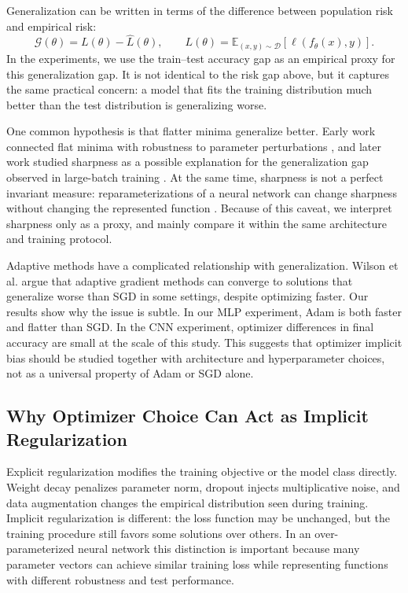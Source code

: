 \documentclass[11pt]{article}
\begin{document}
Generalization can be written in terms of the difference between population risk and empirical risk:
\[
\mathcal{G}(\theta)
= L(\theta)-\widehat L(\theta),
\qquad
L(\theta)=\mathbb{E}_{(x,y)\sim \mathcal{D}}
[\ell(f_\theta(x),y)].
\]
In the experiments, we use the train--test accuracy gap as an empirical proxy for this generalization gap. It is not identical to the risk gap above, but it captures the same practical concern: a model that fits the training distribution much better than the test distribution is generalizing worse.

One common hypothesis is that flatter minima generalize better. Early work connected flat minima with robustness to parameter perturbations \cite{hochreiter1997flat}, and later work studied sharpness as a possible explanation for the generalization gap observed in large-batch training \cite{keskar2017large}. At the same time, sharpness is not a perfect invariant measure: reparameterizations of a neural network can change sharpness without changing the represented function \cite{dinh2017sharp}. Because of this caveat, we interpret sharpness only as a proxy, and mainly compare it within the same architecture and training protocol.

Adaptive methods have a complicated relationship with generalization. Wilson et al. \cite{wilson2017marginal} argue that adaptive gradient methods can converge to solutions that generalize worse than SGD in some settings, despite optimizing faster. Our results show why the issue is subtle. In our MLP experiment, Adam is both faster and flatter than SGD. In the CNN experiment, optimizer differences in final accuracy are small at the scale of this study. This suggests that optimizer implicit bias should be studied together with architecture and hyperparameter choices, not as a universal property of Adam or SGD alone.

\subsection{Why Optimizer Choice Can Act as Implicit Regularization}

Explicit regularization modifies the training objective or the model class directly. Weight decay penalizes parameter norm, dropout injects multiplicative noise, and data augmentation changes the empirical distribution seen during training. Implicit regularization is different: the loss function may be unchanged, but the training procedure still favors some solutions over others. In an over-parameterized neural network this distinction is important because many parameter vectors can achieve similar training loss while representing functions with different robustness and test performance.
\end{document}

